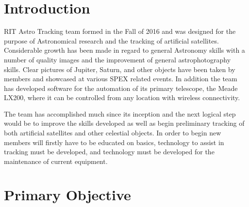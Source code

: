 \documentclass[conference]{IEEEtran} %
\begin{document}

\section{Introduction}
\label{sec:introduction}

 RIT Astro Tracking team formed in the Fall of 2016 and was designed for the purpose of Astronomical research and the tracking of artificial satellites.  Considerable growth has been made in regard to general Astronomy skills with a number of quality images and the improvement of general astrophotography skills.  Clear pictures of Jupiter, Saturn, and other objects have been taken by members and showcased at various SPEX related events.  In addition the team has developed software for the automation of its primary telescope, the Meade LX200, where it can be controlled from any location with wireless connectivity.

The team has accomplished much since its inception and the next logical step would be to improve the skills developed as well as begin preliminary tracking of both artificial satellites and other celestial objects.  In order to begin new members will firstly have to be educated on basics, technology to assist in tracking must be developed, and technology must be developed for the maintenance of current equipment.


\section{Primary Objective}
\label{sec:primary-obj}
\end{document}
